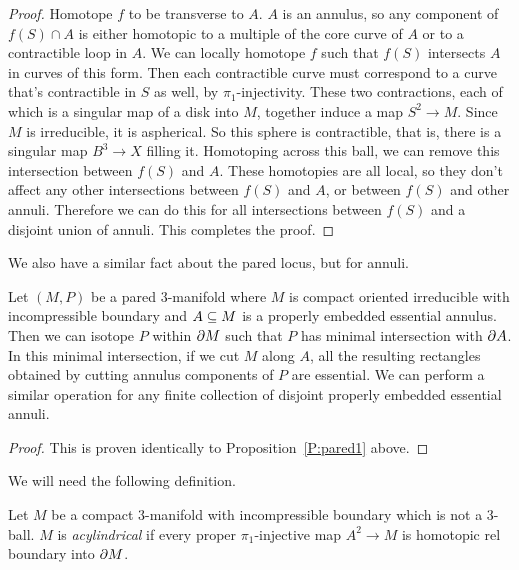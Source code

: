 \begin{proof}

Homotope $f$ to be transverse to $A$. $A$ is an annulus, so any component of
$f(S) \cap A$ is either homotopic to a multiple of the core curve of $A$ or to
a contractible loop in $A$. We can locally homotope $f$ such that $f(S)$
intersects $A$ in curves of this form.  Then each contractible curve must
correspond to a curve that's contractible in $S$ as well, by
$\pi_1$-injectivity. These two contractions, each of which is a singular map of
a disk into $M$, together induce a map $S^2 \to M$. Since $M$ is irreducible,
it is aspherical. So this sphere is contractible, that is, there is a singular
map $B^3 \to X$ filling it. Homotoping across this ball, we can remove this
intersection between $f(S)$ and $A$. These homotopies are all local, so they
don't affect any other intersections between $f(S)$ and $A$, or between $f(S)$
and other annuli. Therefore we can do this for all intersections between $f(S)$
and a disjoint union of annuli. This completes the proof.

\end{proof}

We also have a similar fact about the pared locus, but for annuli.

\begin{prop}

Let $(M,P)$ be a pared $3$-manifold where $M$ is compact oriented irreducible
with incompressible boundary and $A \subseteq M$ is a properly embedded essential
annulus.  Then we can isotope $P$ within $\partial M$ such that $P$ has minimal
intersection with $\partial A$.  In this minimal intersection, if we cut $M$ along
$A$, all the resulting rectangles obtained by cutting annulus components of $P$
are essential.  We can perform a similar operation for any finite collection of
disjoint properly embedded essential annuli.

\end{prop}

\begin{proof}

This is proven identically to Proposition~\ref{P:pared1} above.

\end{proof}

We will need the following definition.

\begin{defn}

Let $M$ be a compact $3$-manifold with incompressible boundary which is not
a 3-ball.  $M$ is \emph{acylindrical} if every proper $\pi_1$-injective map
$A^2 \to M$ is homotopic rel boundary into $\partial M$.

\end{defn}

